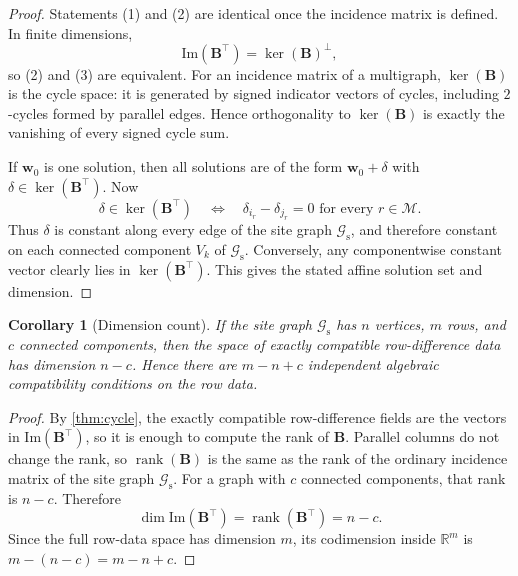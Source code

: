 \documentclass[preprint,12pt]{elsarticle}
\newtheorem{corollary}{Corollary}
\newcommand{\R}{\mathbb{R}}
\newcommand{\weights}{\mathbf{w}}
\newcommand{\rowset}{\mathcal{M}}
\newcommand{\sitegraph}{\mathcal{G}_{\mathrm{s}}}
\newcommand{\inc}{\mathbf{B}}
\begin{document}
\begin{proof}
Statements (1) and (2) are identical once the incidence matrix is defined. In
finite dimensions,
\begin{equation}
    \mathrm{Im}(\inc^\top)=\ker(\inc)^\perp,
\end{equation}
so (2) and (3) are equivalent. For an incidence matrix of a multigraph,
$\ker(\inc)$ is the cycle space: it is generated by signed indicator vectors of
cycles, including $2$-cycles formed by parallel edges. Hence orthogonality to
$\ker(\inc)$ is exactly the vanishing of every signed cycle sum.

If $\weights_0$ is one solution, then all solutions are of the form
$\weights_0+\delta$ with $\delta\in\ker(\inc^\top)$. Now
\begin{equation}
    \delta\in\ker(\inc^\top)
    \quad\Longleftrightarrow\quad
    \delta_{i_r}-\delta_{j_r}=0
    \text{ for every } r\in\rowset.
\end{equation}
Thus $\delta$ is constant along every edge of the site graph $\sitegraph$, and
therefore constant on each connected component $V_k$ of $\sitegraph$.
Conversely, any componentwise constant vector clearly lies in
$\ker(\inc^\top)$. This gives the stated affine solution set and dimension.
\end{proof}

\begin{corollary}[Dimension count]
\label{cor:dimension}
If the site graph $\sitegraph$ has $n$ vertices, $m$ rows, and $c$ connected
components, then the space of exactly compatible row-difference data has
dimension $n-c$. Hence there are $m-n+c$ independent algebraic compatibility
conditions on the row data.
\end{corollary}

\begin{proof}
By \cref{thm:cycle}, the exactly compatible row-difference fields are the
vectors in $\mathrm{Im}(\inc^\top)$, so it is enough to compute the rank of
$\inc$. Parallel columns do not change the rank, so $\operatorname{rank}(\inc)$
is the same as the rank of the ordinary incidence matrix of the site graph
$\sitegraph$. For a graph with $c$ connected components, that rank is $n-c$.
Therefore
\begin{equation}
    \dim \mathrm{Im}(\inc^\top)=\operatorname{rank}(\inc^\top)=n-c.
\end{equation}
Since the full row-data space has dimension $m$, its codimension inside
$\R^m$ is $m-(n-c)=m-n+c$.
\end{proof}
\end{document}
